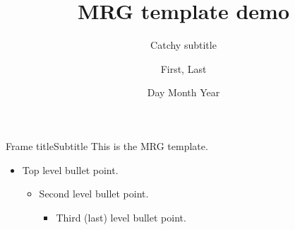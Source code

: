 \documentclass{beamer}
\title{MRG template demo}
\subtitle{Catchy subtitle}
\author{First, Last}
\date{Day Month Year}
\begin{document}
\maketitle

\begin{frame}{Frame title}{Subtitle}
  This is the MRG template.
  \begin{itemize}
    \item Top level bullet point.
      \begin{itemize}
        \item Second level bullet point.
          \begin{itemize}
            \item Third (last) level bullet point.
          \end{itemize}
      \end{itemize}
  \end{itemize}
\end{frame}
\end{document}
